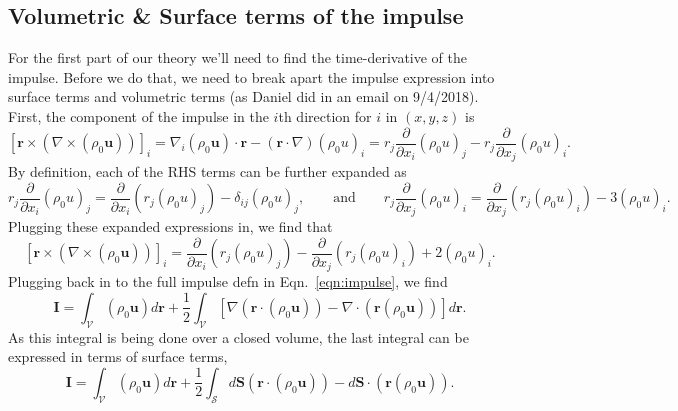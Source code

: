 \documentclass[onecolumn, amsmath, amsfonts, amssymb]{aastex62}
\newcommand{\grad}{\ensuremath{\nabla}}
\begin{document}
\subsection{Volumetric \& Surface terms of the impulse}
For the first part of our theory we'll need to find the time-derivative of the impulse. Before we do that, 
we need to break apart the impulse expression into surface terms and volumetric terms (as Daniel did in an email
on 9/4/2018). First, the component of the impulse in the $i$th direction for $i$ in $(x,y,z)$ is
$$
[\bm{r}\times(\grad\times(\rho_0\bm{u}))]_i = 
\grad_i(\rho_0\bm{u}) \cdot \bm{r}- (\bm{r}\cdot\grad)(\rho_0 u)_i = 
r_j\frac{\partial}{\partial x_i}(\rho_0 u)_j - r_j \frac{\partial}{\partial x_j}(\rho_0 u)_i.
$$
By definition, each of the RHS terms can be further expanded as
$$
r_j\frac{\partial}{\partial x_i}(\rho_0 u)_j =
\frac{\partial}{\partial x_i}(r_j(\rho_0 u)_j) - \delta_{ij}(\rho_0 u)_j,\qquad\text{and}
\qquad
r_j \frac{\partial}{\partial x_j}(\rho_0 u)_i =
\frac{\partial}{\partial x_j}(r_j(\rho_0 u)_i) - 3(\rho_0 u)_i.
$$
Plugging these expanded expressions in, we find that
$$
[\bm{r}\times(\grad\times(\rho_0\bm{u}))]_i = 
\frac{\partial}{\partial x_i}(r_j(\rho_0 u)_j) -
\frac{\partial}{\partial x_j}(r_j(\rho_0 u)_i) +
2(\rho_0 u)_i.
$$
Plugging back in to the full impulse defn in Eqn.~\ref{eqn:impulse}, we find
\begin{equation}
\bm{I} = \int_{\mathcal{V}} (\rho_0 \bm{u}) d\bm{r} + 
\frac{1}{2}\int_{\mathcal{V}} [\grad (\bm{r}\cdot(\rho_0 \bm{u})) - \grad \cdot(\bm{r}(\rho_0\bm{u}))] d\bm{r}.
\end{equation}
As this integral is being done over a closed volume, the last integral can be expressed in terms of surface terms,
\begin{equation}
\bm{I} = \int_{\mathcal{V}} (\rho_0 \bm{u}) d\bm{r} + 
\frac{1}{2}\int_{\mathcal{S}} d\bm{S}(\bm{r}\cdot(\rho_0 \bm{u})) - d\bm{S} \cdot(\bm{r}(\rho_0\bm{u})).
\end{equation}




\end{document}
